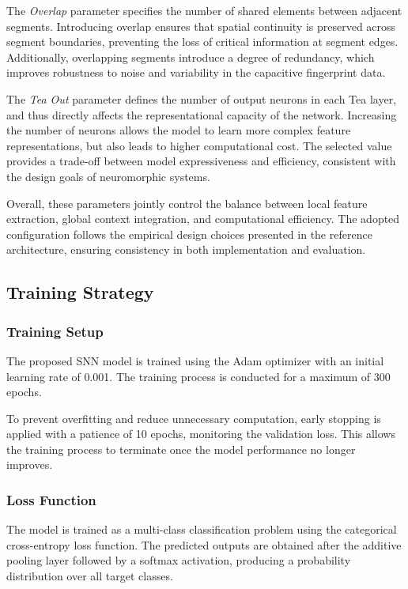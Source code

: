 \documentclass[../main.tex]{subfiles}
\begin{document}
The \textit{Overlap} parameter specifies the number of shared elements between adjacent segments. Introducing overlap ensures that spatial continuity is preserved across segment boundaries, preventing the loss of critical information at segment edges. Additionally, overlapping segments introduce a degree of redundancy, which improves robustness to noise and variability in the capacitive fingerprint data.

The \textit{Tea Out} parameter defines the number of output neurons in each Tea layer, and thus directly affects the representational capacity of the network. Increasing the number of neurons allows the model to learn more complex feature representations, but also leads to higher computational cost. The selected value provides a trade-off between model expressiveness and efficiency, consistent with the design goals of neuromorphic systems.

Overall, these parameters jointly control the balance between local feature extraction, global context integration, and computational efficiency. The adopted configuration follows the empirical design choices presented in the reference architecture, ensuring consistency in both implementation and evaluation.
\subsection{Training Strategy}

\subsubsection{Training Setup}

The proposed SNN model is trained using the Adam optimizer with an initial learning rate of 0.001. The training process is conducted for a maximum of 300 epochs.

To prevent overfitting and reduce unnecessary computation, early stopping is applied with a patience of 10 epochs, monitoring the validation loss. This allows the training process to terminate once the model performance no longer improves.

\subsubsection{Loss Function}
The model is trained as a multi-class classification problem using the categorical cross-entropy loss function. The predicted outputs are obtained after the additive pooling layer followed by a softmax activation, producing a probability distribution over all target classes.
\end{document}
